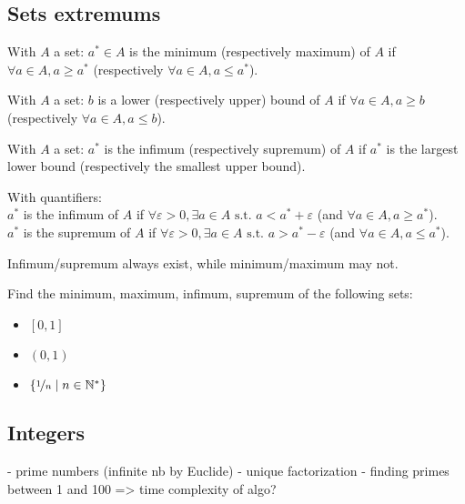 \subsection{Sets extremums}
\begin{definition}
    With $A$ a set: $a^* \in A$ is the minimum (respectively maximum) of $A$ if $\forall a \in A, a \geq a^*$ (respectively $\forall a \in A, a \leq a^*$).
\end{definition}
\begin{definition}
    With $A$ a set: $b$ is a lower (respectively upper) bound of $A$ if $\forall a \in A, a \geq b$ (respectively $\forall a \in A, a \leq b$).
\end{definition}
\begin{definition}
    With $A$ a set: $a^*$ is the infimum (respectively supremum) of $A$ if $a^*$ is the largest lower bound (respectively the smallest upper bound).
    
    With quantifiers:\\
    $a^*$ is the infimum of $A$ if $\forall \varepsilon>0, \exists a \in A \text{ s.t. } a < a^* + \varepsilon$ (and $\forall a \in A, a \geq a^*$).\\
    $a^*$ is the supremum of $A$ if $\forall \varepsilon>0, \exists a \in A \text{ s.t. } a > a^* - \varepsilon$ (and $\forall a \in A, a \leq a^*$).
\end{definition}
Infimum/supremum always exist, while minimum/maximum may not.
\begin{question} Find the minimum, maximum, infimum, supremum of the following sets:
    \begin{itemize}
        \item $\left[0,1\right]$
        \item $\left(0,1\right)$
        \item $\{ \nicefrac{1}{n} \mid n \in \mathbb{N}^* \}$
    \end{itemize}
\end{question}



\subsection{Integers}
- prime numbers (infinite nb by Euclide)
- unique factorization 
- finding primes between 1 and 100 => time complexity of algo?